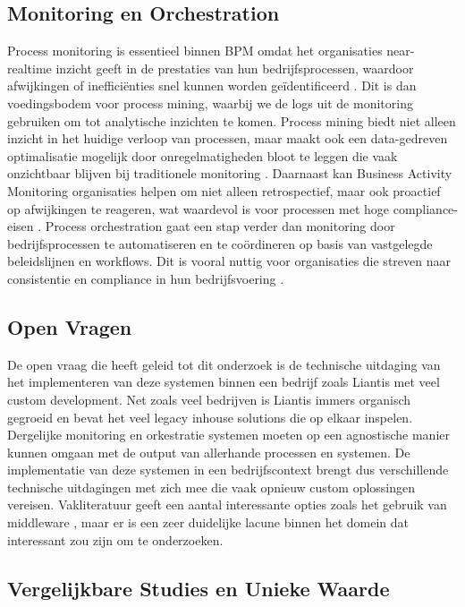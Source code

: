 \subsection{Monitoring en Orchestration}

Process monitoring is essentieel binnen BPM omdat het organisaties near-realtime inzicht geeft in de prestaties van hun bedrijfsprocessen, waardoor afwijkingen of inefficiënties snel kunnen worden geïdentificeerd \autocite{Janiesch2012}. Dit is dan voedingsbodem voor process mining, waarbij we de logs uit de monitoring gebruiken om tot analytische inzichten te komen. Process mining biedt niet alleen inzicht in het huidige verloop van processen, maar maakt ook een data-gedreven optimalisatie mogelijk door onregelmatigheden bloot te leggen die vaak onzichtbaar blijven bij traditionele monitoring \autocite{Aalst2016}. Daarnaast kan Business Activity Monitoring organisaties helpen om niet alleen retrospectief, maar ook proactief op afwijkingen te reageren, wat waardevol is voor processen met hoge compliance-eisen \autocite{Janiesch2012}. Process orchestration gaat een stap verder dan monitoring door bedrijfsprocessen te automatiseren en te coördineren op basis van vastgelegde beleidslijnen en workflows. Dit is vooral nuttig voor organisaties die streven naar consistentie en compliance in hun bedrijfsvoering \autocite{Weske2019}. 

\subsection{Open Vragen}

De open vraag die heeft geleid tot dit onderzoek is de technische uitdaging van het implementeren van deze systemen binnen een bedrijf zoals Liantis met veel custom development. Net zoals veel bedrijven is Liantis immers organisch gegroeid en bevat het veel legacy inhouse solutions die op elkaar inspelen. Dergelijke monitoring en orkestratie systemen moeten op een agnostische manier kunnen omgaan met de output van allerhande processen en systemen. De implementatie van deze systemen in een bedrijfscontext brengt dus verschillende technische uitdagingen met zich mee die vaak opnieuw custom oplossingen vereisen. Vakliteratuur geeft een aantal interessante opties zoals het gebruik van middleware \autocite{Weber2018}, maar er is een zeer duidelijke lacune binnen het domein dat interessant zou zijn om te onderzoeken. 

\subsection{Vergelijkbare Studies en Unieke Waarde}

